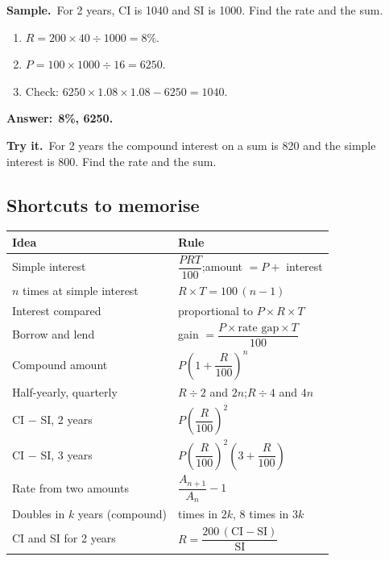 \documentclass[11pt,a4paper]{article}
\let\oldsubsection\subsection
\renewcommand{\subsection}{\needspace{9\baselineskip}\oldsubsection}
\newif\ifkeepsamp
\newcommand{\ans}[1]{\par\nopagebreak\noindent\textbf{\color{ember}Answer:}\ \textbf{#1}\par}
\newcommand{\samp}{\ifkeepsamp\needspace{4\baselineskip}\fi\textbf{\color{ember}Sample.}\ }
\newcommand{\tryit}[1]{\textbf{\color{ember}Try it.}\ #1}
\begin{document}
\samp For 2 years, CI is 1040 and SI is 1000. Find the rate and the sum.
\begin{enumerate}
\item $R = 200 \times 40 \div 1000 = 8\%$.
\item $P = 100 \times 1000 \div 16 = 6250$.
\item Check: $6250 \times 1.08 \times 1.08 - 6250 = 1040$.
\end{enumerate}
\ans{8\%, 6250.}

\tryit For 2 years the compound interest on a sum is 820 and the simple interest is 800. Find the rate and the sum.

\subsection*{Shortcuts to memorise}
\begin{center}\small\renewcommand{\arraystretch}{1.9}\setlength{\tabcolsep}{8pt}
\begin{tabularx}{\linewidth}{@{}>{\raggedright\arraybackslash}X>{\raggedright\arraybackslash}X@{}}
\toprule
\textbf{\color{slate}Idea} & \textbf{\color{slate}Rule} \\ \midrule
Simple interest & $\dfrac{P R T}{100}$;\quad amount $=P+$ interest \\
$n$ times at simple interest & $R\times T = 100\,(n-1)$ \\
Interest compared & proportional to $P\times R\times T$ \\
Borrow and lend & gain $=\dfrac{P\times\text{rate gap}\times T}{100}$ \\
Compound amount & $P\left(1+\dfrac{R}{100}\right)^n$ \\
Half-yearly, quarterly & $R\div 2$ and $2n$;\quad $R\div 4$ and $4n$ \\
CI $-$ SI, 2 years & $P\left(\dfrac{R}{100}\right)^2$ \\
CI $-$ SI, 3 years & $P\left(\dfrac{R}{100}\right)^2\left(3+\dfrac{R}{100}\right)$ \\
Rate from two amounts & $\dfrac{A_{n+1}}{A_n}-1$ \\
Doubles in $k$ years (compound) & 4 times in $2k$, 8 times in $3k$ \\
CI and SI for 2 years & $R=\dfrac{200\,(\text{CI}-\text{SI})}{\text{SI}}$ \\
\bottomrule
\end{tabularx}\end{center}
\end{document}
